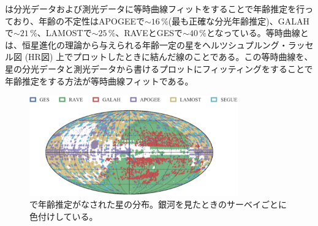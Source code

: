 \cite{SD18}は分光データおよび測光データに等時曲線フィットをすることで年齢推定を行っており、年齢の不定性はAPOGEEで$\sim 16\,\%$(最も正確な分光年齢推定)、GALAHで$\sim 21\,\%$、LAMOSTで$\sim 25\,\%$、RAVEとGESで$\sim 40\,\%$となっている。等時曲線とは、恒星進化の理論から与えられる年齢一定の星をヘルツシュプルング・ラッセル図 (HR図) 上でプロットしたときに結んだ線のことである。この等時曲線を、星の分光データと測光データから書けるプロットにフィッティングをすることで年齢推定をする方法が等時曲線フィットである。

\begin{figure}[htbp]
\begin{center}
	\includegraphics[width=9cm]{fig/SD18_fig1.pdf}
	\caption{\cite{SD18}で年齢推定がなされた星の分布。銀河を見たときのサーベイごとに色付けしている。}
	\label{fig2}
\end{center}
\end{figure}

